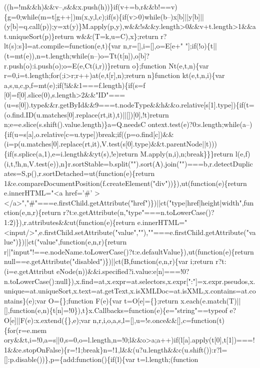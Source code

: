 \begin{DoxyCode}
{      ((h=!m&&h)&&v--,s&&x.push(h))\}if(v+=b,r&&b!==v)\{g=0;while(m=t[g++])m(x,y,l,c);if(s)\{if(v>0)while(b--)x[b]||y[b]||(y[b]=q.call(p));y=xt(y)\}M.apply(p,y),w&&!s&&y.length>0&&v+t.length>1&&at.uniqueSort(p)\}return
       w&&(T=k,u=C),x\};return r?lt(s):s\}l=at.compile=function(e,t)\{var n,r=[],i=[],o=E[e+"
       "];if(!o)\{t||(t=mt(e)),n=t.length;while(n--)o=Tt(t[n]),o[b]?r.push(o):i.push(o);o=E(e,Ct(i,r))\}return o\};function Nt(e,t,n)\{var
       r=0,i=t.length;for(;i>r;r++)at(e,t[r],n);return n\}function kt(e,t,n,i)\{var
       a,s,u,c,p,f=mt(e);if(!i&&1===f.length)\{if(s=f
      [0]=f[0].slice(0),s.length>2&&"ID"===(u=s[0]).type&&r.getById&&9===t.nodeType&&h&&o.relative[s[1].type])\{if(t=(o.find.ID(u.matches[0].replace(rt,it),t)||[])[0],!t)return
       n;e=e.slice(s.shift().value.length)\}a=Q.needsC
      ontext.test(e)?0:s.length;while(a--)\{if(u=s[a],o.relative[c=u.type])break;if((p=o.find[c])&&(i=p(u.matches[0].replace(rt,it),V.test(s[0].type)&&t.parentNode||t)))\{if(s.splice(a,1),e=i.length&&yt(s),!e)return
       M.apply(n,i),n;break\}\}\}return
       l(e,f)(i,t,!h,n,V.test(e)),n\}r.sortStable=b.split("").sort(A).join("")===b,r.detectDuplicates=S,p(),r.sortDetached=ut(function(e)\{return
       1&e.compareDocumentPosition(f.createElement("div"))\}),ut(function(e)\{return e.innerHTML="<a href='}#\textcolor{stringliteral}{'
      ></a>","#"===e.firstChild.getAttribute("href")\})||ct("type|href|height|width",function(e,n,r)\{return
       r?t:e.getAttribute(n,"type"===n.toLowerCase()?1:2)\}),r.attributes&&ut(function(e)\{return
       e.innerHTML="<input/>",e.firstChild.setAttribute("value",""),""===e.firstChild.getAttribute("value")\})||ct("value",function(e,n,r)\{return
       r||"input"!==e.nodeName.toLowerCase()?t:e.defaultValue\}),ut(function(e)\{return null==e.getAttribute("disabled")\})||ct(B,function(e,n,r)\{var i;return
       r?t:(i=e.getAttribut
      eNode(n))&&i.specified?i.value:e[n]===!0?n.toLowerCase():null\}),x.find=at,x.expr=at.selectors,x.expr[":"]=x.expr.pseudos,x.unique=at.uniqueSort,x.text=at.getText,x.isXMLDoc=at.isXML,x.contains=at.contains\}(e);var
       O=\{\};function F(e)\{var t=O[e]=\{\};return
       x.each(e.match(T)||[],function(e,n)\{t[n]=!0\}),t\}x.Callbacks=function(e)\{e="string"==typeof e?O[e]||F(e):x.extend(\{\},e);var
       n,r,i,o,a,s,l=[],u=!e.once&&[],c=function(t)\{for(r=e.mem
      ory&&t,i=!0,a=s||0,s=0,o=l.length,n=!0;l&&o>a;a++)if(l[a].apply(t[0],t[1])===!1&&e.stopOnFalse)\{r=!1;break\}n=!1,l&&(u?u.length&&c(u.shift()):r?l=[]:p.disable())\},p=\{add:function()\{if(l)\{var t=l.length;(function
}
\end{DoxyCode}
